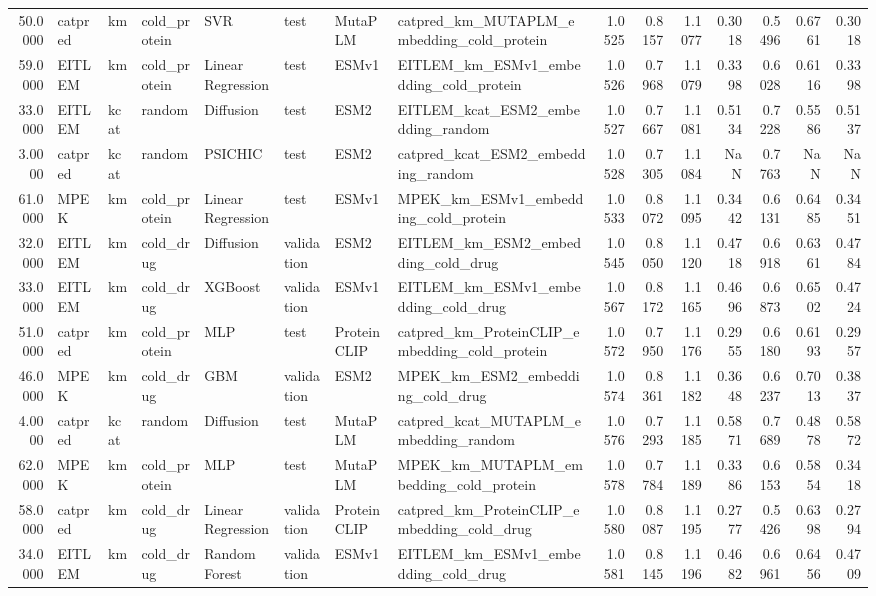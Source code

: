 \begin{tabular}{rlllllllrrrrrrr}
50.0000 & catpred & km & cold_protein & SVR & test & MutaPLM & catpred_km_MUTAPLM_embedding_cold_protein & 1.0525 & 0.8157 & 1.1077 & 0.3018 & 0.5496 & 0.6761 & 0.3018 \\
59.0000 & EITLEM & km & cold_protein & Linear Regression & test & ESMv1 & EITLEM_km_ESMv1_embedding_cold_protein & 1.0526 & 0.7968 & 1.1079 & 0.3398 & 0.6028 & 0.6116 & 0.3398 \\
33.0000 & EITLEM & kcat & random & Diffusion & test & ESM2 & EITLEM_kcat_ESM2_embedding_random & 1.0527 & 0.7667 & 1.1081 & 0.5134 & 0.7228 & 0.5586 & 0.5137 \\
3.0000 & catpred & kcat & random & PSICHIC & test & ESM2 & catpred_kcat_ESM2_embedding_random & 1.0528 & 0.7305 & 1.1084 & NaN & 0.7763 & NaN & NaN \\
61.0000 & MPEK & km & cold_protein & Linear Regression & test & ESMv1 & MPEK_km_ESMv1_embedding_cold_protein & 1.0533 & 0.8072 & 1.1095 & 0.3442 & 0.6131 & 0.6485 & 0.3451 \\
32.0000 & EITLEM & km & cold_drug & Diffusion & validation & ESM2 & EITLEM_km_ESM2_embedding_cold_drug & 1.0545 & 0.8050 & 1.1120 & 0.4718 & 0.6918 & 0.6361 & 0.4784 \\
33.0000 & EITLEM & km & cold_drug & XGBoost & validation & ESMv1 & EITLEM_km_ESMv1_embedding_cold_drug & 1.0567 & 0.8172 & 1.1165 & 0.4696 & 0.6873 & 0.6502 & 0.4724 \\
51.0000 & catpred & km & cold_protein & MLP & test & ProteinCLIP & catpred_km_ProteinCLIP_embedding_cold_protein & 1.0572 & 0.7950 & 1.1176 & 0.2955 & 0.6180 & 0.6193 & 0.2957 \\
46.0000 & MPEK & km & cold_drug & GBM & validation & ESM2 & MPEK_km_ESM2_embedding_cold_drug & 1.0574 & 0.8361 & 1.1182 & 0.3648 & 0.6237 & 0.7013 & 0.3837 \\
4.0000 & catpred & kcat & random & Diffusion & test & MutaPLM & catpred_kcat_MUTAPLM_embedding_random & 1.0576 & 0.7293 & 1.1185 & 0.5871 & 0.7689 & 0.4878 & 0.5872 \\
62.0000 & MPEK & km & cold_protein & MLP & test & MutaPLM & MPEK_km_MUTAPLM_embedding_cold_protein & 1.0578 & 0.7784 & 1.1189 & 0.3386 & 0.6153 & 0.5854 & 0.3418 \\
58.0000 & catpred & km & cold_drug & Linear Regression & validation & ProteinCLIP & catpred_km_ProteinCLIP_embedding_cold_drug & 1.0580 & 0.8087 & 1.1195 & 0.2777 & 0.5426 & 0.6398 & 0.2794 \\
34.0000 & EITLEM & km & cold_drug & Random Forest & validation & ESMv1 & EITLEM_km_ESMv1_embedding_cold_drug & 1.0581 & 0.8145 & 1.1196 & 0.4682 & 0.6961 & 0.6456 & 0.4709 \\

\end{tabular}
